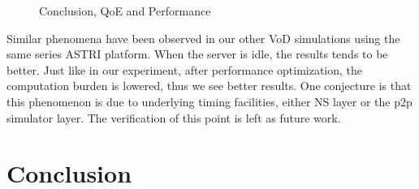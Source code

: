 \documentclass[11pt,a4paper]{article}
\begin{document}
\begin{figure}[htb]
\centering
	\caption{Conclusion, QoE and Performance}
	\label{fig:simu_con_detail}
\end{figure}

Similar phenomena have been observed in our other VoD simulations using 
the same series ASTRI platform\cite{huang2010simulation}. When the server 
is idle, the results tends to be better. Just like in our experiment, after 
performance optimization, the computation burden is lowered, thus we see 
better results. One conjecture is that this phenomenon is due to underlying 
timing facilities, either NS\cite{ns,pdns} layer or the p2p simulator 
layer\cite{huang2010simulation}. The verification of this point is
left as future work. 


\section{Conclusion}
\label{sec:conclusion}
\end{document}
